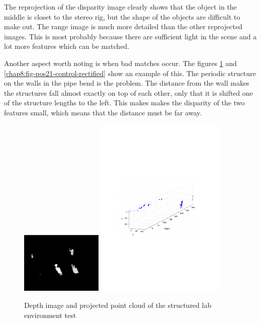 The reprojection of the disparity image clearly shows that the object in the
middle is closet to the stereo rig, but the shape of the objects are difficult to make
out. 
The range image is much more detailed than the other reprojected images. This is most probably
because there are sufficient light in the scene and a lot more features which can be
matched.


Another aspect worth noting is when bad matches occur. The figures
\ref{chap8:fig-pos21-control-depth} and \ref{chap8:fig-pos21-control-rectified} show an
example of this. The periodic structure on the walls in the pipe bend is the problem. The
distance from the wall makes the structures fall almost exactly on top of each other, only
that it is shifted one of the structure lengths to the left. This makes makes the
disparity of the two features small, which means that the distance must be far away. 
\begin{figure}[htbp]
    \centering
    \includegraphics[width=0.35\textwidth]{pics/pos21-control-depth}
    \includegraphics[width=0.55\textwidth]{pics/pos21-control-3d}
    \caption{Depth image and projected point cloud of the structured lab environment test}
    \label{chap8:fig-pos21-control-depth}
\end{figure}
